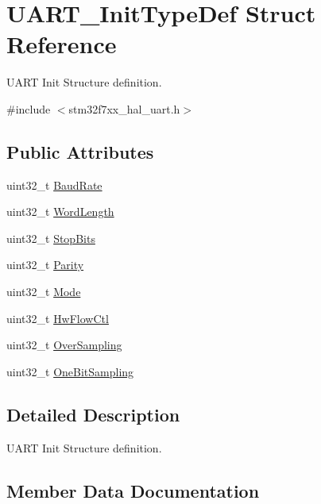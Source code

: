 \hypertarget{struct_u_a_r_t___init_type_def}{}\section{U\+A\+R\+T\+\_\+\+Init\+Type\+Def Struct Reference}
\label{struct_u_a_r_t___init_type_def}


U\+A\+RT Init Structure definition.  




{\ttfamily \#include $<$stm32f7xx\+\_\+hal\+\_\+uart.\+h$>$}

\subsection*{Public Attributes}
\begin{DoxyCompactItemize}
\item 
uint32\+\_\+t \mbox{\hyperlink{struct_u_a_r_t___init_type_def_ae460c2e4d7ddc67bca9f5756f45b1d83}{Baud\+Rate}}
\item 
uint32\+\_\+t \mbox{\hyperlink{struct_u_a_r_t___init_type_def_a0f1cd85e62aa4fd4b36ee9e610e7789f}{Word\+Length}}
\item 
uint32\+\_\+t \mbox{\hyperlink{struct_u_a_r_t___init_type_def_a6717dfe595617c7b2d57139d9cd306ef}{Stop\+Bits}}
\item 
uint32\+\_\+t \mbox{\hyperlink{struct_u_a_r_t___init_type_def_adc92243425cb18cb8b5f03692841db48}{Parity}}
\item 
uint32\+\_\+t \mbox{\hyperlink{struct_u_a_r_t___init_type_def_ab2ee6ea5a5d4ca5ee6b759be197bcfcb}{Mode}}
\item 
uint32\+\_\+t \mbox{\hyperlink{struct_u_a_r_t___init_type_def_adbf4734130666b94201c6658464c1622}{Hw\+Flow\+Ctl}}
\item 
uint32\+\_\+t \mbox{\hyperlink{struct_u_a_r_t___init_type_def_a77c2c86a2186e09cbf022e27c0c82324}{Over\+Sampling}}
\item 
uint32\+\_\+t \mbox{\hyperlink{struct_u_a_r_t___init_type_def_a1662b82dc43d9137c3a4485794c94388}{One\+Bit\+Sampling}}
\end{DoxyCompactItemize}


\subsection{Detailed Description}
U\+A\+RT Init Structure definition. 

\subsection{Member Data Documentation}
\mbox{\label{struct_u_a_r_t___init_type_def_ae460c2e4d7ddc67bca9f5756f45b1d83}} 
